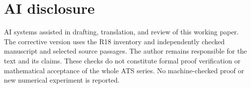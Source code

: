 \section*{AI disclosure}
AI systems assisted in drafting, translation, and review of this working
paper. The corrective version uses the R18 inventory and independently
checked manuscript and selected source passages. The author remains
responsible for the text and its claims. These checks do not constitute
formal proof verification or mathematical acceptance of the whole ATS
series. No machine-checked proof or new numerical experiment is reported.
